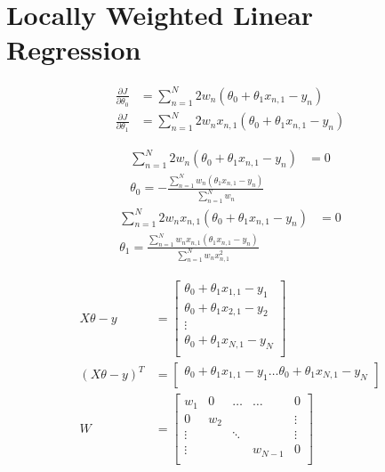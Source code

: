 \documentclass[11pt]{article}
\newcommand{\solution}[1]{{{\color{blue}{\bf Solution:} {#1}}}}
\begin{document}
\section{Locally Weighted Linear Regression}
\begin{enumerate}
\item
\solution{
\begin{align}
\tfrac{\partial J}{\partial \theta_0} &= \sum_{n=1}^{N} 2w_n(\theta_0 + \theta_1 x_{n,1}-y_n)\\
\tfrac{\partial J}{\partial \theta_1} &= \sum_{n=1}^{N} 2w_nx_{n,1}(\theta_0 + \theta_1 x_{n,1}-y_n)
\end{align}
\vspace{1cm}

\item
\solution{
\begin{align}
\sum_{n=1}^{N} 2w_n(\theta_0 + \theta_1 x_{n,1}-y_n) &= 0 \\
\theta_0 = -\frac{\sum_{n=1}^{N}w_n(\theta_1 x_{n,1}-y_n)}{\sum_{n=1}^{N}w_n}
\end{align}
\vspace{.5cm}
\begin{align}
\sum_{n=1}^{N} 2w_nx_{n,1}(\theta_0 + \theta_1 x_{n,1}-y_n) &= 0 \\
\theta_1=\frac{\sum_{n=1}^{N}w_nx_{n,1}(\theta_1 x_{n,1}-y_n)}{\sum_{n=1}^{N}w_nx_{n,1}^2}
\end{align}
}
\newpage
\item
\solution
{
\begin{align}
X\theta - y &= 
\begin{bmatrix}
\theta_0 + \theta_1x_{1,1}-y_1 \\
\theta_0 + \theta_1x_{2,1}-y_2 \\
\vdots \\
\theta_0 + \theta_1x_{N,1}-y_N \\
\end{bmatrix}\\
(X\theta - y)^T &=
\begin{bmatrix}
\theta_0 + \theta_1x_{1,1}-y_1 \hdots \theta_0 + \theta_1x_{N,1}-y_N \\
\end{bmatrix} \\
W &= 
\begin{bmatrix}
w_1 & 0 & \hdots & \hdots & 0 \\
0 & w_2 &&& \vdots \\
\vdots && \ddots && \vdots\\
\vdots &&& w_{N-1}& 0\\

\end{bmatrix}
\end{align}}}
\end{enumerate}
\end{document}
